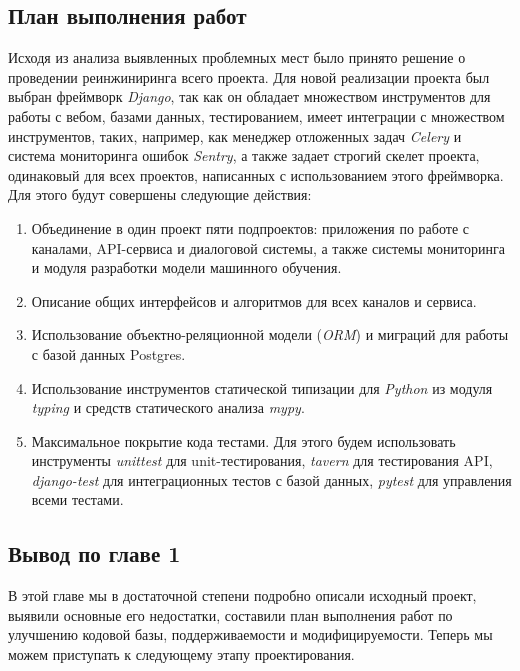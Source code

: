     \subsection{План выполнения работ}
    Исходя из анализа выявленных проблемных мест было принято решение о проведении реинжиниринга всего проекта.
    Для новой реализации проекта был выбран фреймворк \textit{Django}\cite{docs.django}, так как он обладает множеством инструментов
    для работы с вебом, базами данных, тестированием, имеет интеграции с множеством инструментов, таких, например,
    как менеджер отложенных задач \textit{Celery}\cite{docs.celery} и система мониторинга ошибок \textit{Sentry},
    а также задает строгий скелет проекта, одинаковый для всех проектов, написанных с использованием этого фреймворка.
    Для этого будут совершены следующие действия:
    \begin{enumerate}
        \item Объединение в один проект пяти подпроектов: приложения по работе с каналами, API-сервиса и диалоговой системы,
        а также системы мониторинга и модуля разработки модели машинного обучения.
        \item Описание общих интерфейсов и алгоритмов для всех каналов и сервиса.
        \item Использование объектно-реляционной модели (\textit{ORM}) и миграций для работы с базой данных
        Postgres\cite{postgres.stepic}.
        \item Использование инструментов статической типизации для \textit{Python} из модуля \textit{typing}
        и средств статического анализа \textit{mypy}\cite{docs.python}.
        \item Максимальное покрытие кода тестами. Для этого будем использовать
        инструменты \textit{unittest}\cite{docs.python} для unit-тестирования, \textit{tavern} для тестирования API,
        \textit{django-test} для интеграционных тестов с базой данных, \textit{pytest} для управления всеми тестами.
    \end{enumerate}

    \subsection*{Вывод по главе 1}
    В этой главе мы в достаточной степени подробно описали исходный проект, выявили основные его
    недостатки, составили план выполнения работ по улучшению кодовой базы, поддерживаемости и модифицируемости.
    Теперь мы можем приступать к следующему этапу проектирования.

